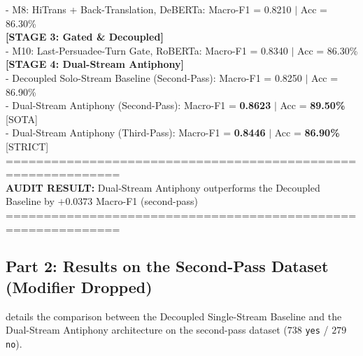 \begin{terminalbox}
- M8: HiTrans + Back-Translation, DeBERTa\hphantom{XXXXXX}: Macro-F1 = 0.8210 $\mid$ Acc = 86.30\% \\ \relax
\textbf{[STAGE 3: Gated \& Decoupled]} \\ \relax
- M10: Last-Persuadee-Turn Gate, RoBERTa\hphantom{XXXXXXX}: Macro-F1 = 0.8340 $\mid$ Acc = 86.30\% \\ \relax
\tcbbreak
\textbf{[STAGE 4: Dual-Stream Antiphony]} \\ \relax
- Decoupled Solo-Stream Baseline (Second-Pass)\hphantom{X}: Macro-F1 = 0.8250 $\mid$ Acc = 86.90\% \\ \relax
- Dual-Stream Antiphony (Second-Pass)\hphantom{XXXXXXXXXX}: Macro-F1 = \textbf{0.8623} $\mid$ Acc = \textbf{89.50\%} [SOTA] \\ \relax
- Dual-Stream Antiphony (Third-Pass)\hphantom{XXXXXXXXXXX}: Macro-F1 = \textbf{0.8446} $\mid$ Acc = \textbf{86.90\%} [STRICT] \\ \relax
============================================================= \\ \relax
\textbf{AUDIT RESULT:} Dual-Stream Antiphony outperforms the Decoupled Baseline by $+0.0373$ Macro-F1 (second-pass) \\ \relax
=============================================================
\end{terminalbox}

\subsection{Part 2: Results on the Second-Pass Dataset (Modifier Dropped)}
 details the comparison between the Decoupled Single-Stream Baseline and the Dual-Stream Antiphony architecture on the second-pass dataset ($738$ \texttt{yes} / $279$ \texttt{no}).

